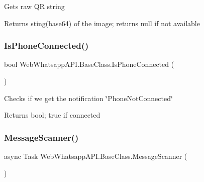 Gets raw QR string 

\begin{DoxyReturn}{Returns}
sting(base64) of the image; returns null if not available
\end{DoxyReturn}
\mbox{\label{class_web_whatsapp_a_p_i_1_1_base_class_a8784fc769ca33afbbdb7478f0998de19}} 
\subsubsection{\texorpdfstring{Is\+Phone\+Connected()}{IsPhoneConnected()}}
{\footnotesize\ttfamily bool Web\+Whatsapp\+A\+P\+I.\+Base\+Class.\+Is\+Phone\+Connected (\begin{DoxyParamCaption}{ }\end{DoxyParamCaption})\hspace{0.3cm}{\ttfamily [inline]}}



Check\textquotesingle{}s if we get the notification \char`\"{}\+Phone\+Not\+Connected\char`\"{} 

\begin{DoxyReturn}{Returns}
bool; true if connected
\end{DoxyReturn}
\mbox{\label{class_web_whatsapp_a_p_i_1_1_base_class_a1da111623bfd6bee9401b049560e2646}} 
\subsubsection{\texorpdfstring{Message\+Scanner()}{MessageScanner()}}
{\footnotesize\ttfamily async Task Web\+Whatsapp\+A\+P\+I.\+Base\+Class.\+Message\+Scanner (\begin{DoxyParamCaption}{ }\end{DoxyParamCaption})\hspace{0.3cm}{\ttfamily [inline]}}



